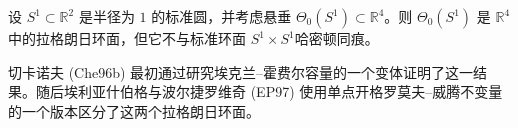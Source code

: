 \begin{theorem}[切卡诺夫]\label{thm:chekanov-suspension-torus}
设 $S^1\subset\mathbb R^2$ 是半径为 $1$ 的标准圆，并考虑悬垂
$\Theta_0(S^1)\subset\mathbb R^4$。则 $\Theta_0(S^1)$ 是 $\mathbb R^4$ 中的拉格朗日环面，但它不与标准环面
$S^1\times S^1$哈密顿同痕。
\end{theorem}

切卡诺夫 (Che96b) 最初通过研究埃克兰--霍费尔容量的一个变体证明了这一结果。随后埃利亚什伯格与波尔捷罗维奇 (EP97) 使用单点开格罗莫夫--威腾不变量的一个版本区分了这两个拉格朗日环面。
